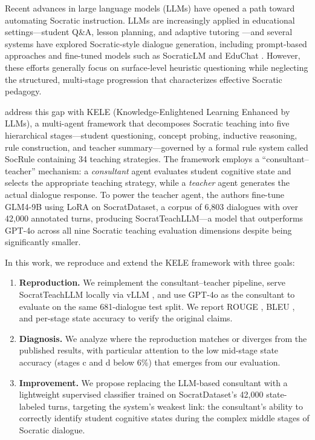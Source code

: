 \documentclass[11pt]{article}
\begin{document}
Recent advances in large language models (LLMs) have opened a path toward automating Socratic instruction. LLMs are increasingly applied in educational settings---student Q\&A, lesson planning, and adaptive tutoring \citep{kasneci2023chatgpt, gan2023llmedu}---and several systems have explored Socratic-style dialogue generation, including prompt-based approaches \citep{zhang2024spl, alhossami2024socratic} and fine-tuned models such as SocraticLM \citep{liu2024socraticLM} and EduChat \citep{dan2023educhat}. However, these efforts generally focus on surface-level heuristic questioning while neglecting the structured, multi-stage progression that characterizes effective Socratic pedagogy.

\citet{peng2025kele} address this gap with KELE (Knowledge-Enlightened Learning Enhanced by LLMs), a multi-agent framework that decomposes Socratic teaching into five hierarchical stages---student questioning, concept probing, inductive reasoning, rule construction, and teacher summary---governed by a formal rule system called SocRule containing 34 teaching strategies. The framework employs a ``consultant--teacher'' mechanism: a \emph{consultant} agent evaluates student cognitive state and selects the appropriate teaching strategy, while a \emph{teacher} agent generates the actual dialogue response. To power the teacher agent, the authors fine-tune GLM4-9B \citep{glm2024chatglm} using LoRA \citep{hu2022lora} on SocratDataset, a corpus of 6,803 dialogues with over 42,000 annotated turns, producing SocratTeachLLM---a model that outperforms GPT-4o across all nine Socratic teaching evaluation dimensions despite being significantly smaller.

In this work, we reproduce and extend the KELE framework with three goals:

\begin{enumerate}
    \item \textbf{Reproduction.} We reimplement the consultant--teacher pipeline, serve SocratTeachLLM locally via vLLM \citep{kwon2023vllm}, and use GPT-4o \citep{openai2024gpt4o} as the consultant to evaluate on the same 681-dialogue test split. We report ROUGE \citep{lin2004rouge}, BLEU \citep{papineni2002bleu}, and per-stage state accuracy to verify the original claims.
    \item \textbf{Diagnosis.} We analyze where the reproduction matches or diverges from the published results, with particular attention to the low mid-stage state accuracy (stages c and d below 6\%) that emerges from our evaluation.
    \item \textbf{Improvement.} We propose replacing the LLM-based consultant with a lightweight supervised classifier trained on SocratDataset's 42,000 state-labeled turns, targeting the system's weakest link: the consultant's ability to correctly identify student cognitive states during the complex middle stages of Socratic dialogue.
\end{enumerate}
\end{document}
